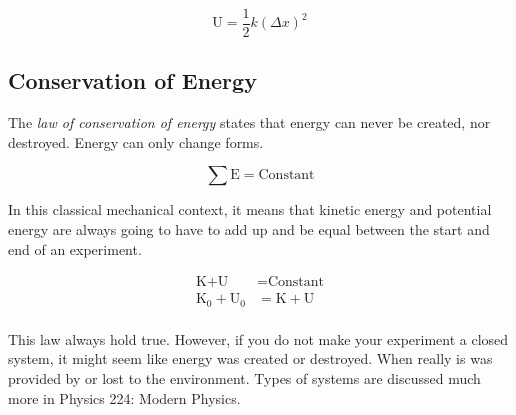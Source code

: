 \begin{equation}\label{eq:Hookes Law and Potential Energy}
  \text{U} = \frac{1}{2} k \left( \Delta x \right)^{2}
\end{equation}

\subsection{Conservation of Energy}\label{subsec:Conservation of Energy}
\begin{definition}\label{def:Conservation of Energy}
  The \emph{law of conservation of energy} states that energy can never be created, nor destroyed.
  Energy can only change forms.

  \begin{equation}\label{eq:Conservation of Energy}
    \sum \text{E} = \text{Constant}
  \end{equation}

  In this classical mechanical context, it means that kinetic energy and potential energy are always going to have to add up and be equal between the start and end of an experiment.

  \begin{equation}\label{eq:Mechanical Conservation of Energy}
    \begin{aligned}
      \text{K} + \text{U} &= \text{Constant} \\
      \text{K}_{0} + \text{U}_{0} &= \text{K} + \text{U} \\
    \end{aligned}
  \end{equation}

  \begin{remark}
    This law always hold true.
    However, if you do not make your experiment a closed system, it might seem like energy was created or destroyed.
    When really is was provided by or lost to the environment.
    Types of systems are discussed much more in Physics 224: Modern Physics.
  \end{remark}
\end{definition}

